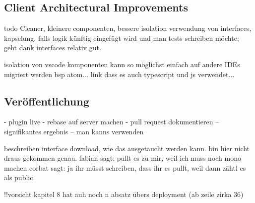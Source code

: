 \subsection{Client Architectural Improvements}
todo
Cleaner, kleinere componenten, bessere isolation
verwendung von interfaces, kapselung. falls logik künftig eingefügt wird und man tests schreiben möchte; geht dank interfaces relativ gut.

isolation von vscode komponenten
kann so möglichst einfach auf andere IDEs migriert werden
bsp atom... link dass es auch typescript und js verwendet...

\subsection{Veröffentlichung}
- plugin live
- rebase auf server machen
- pull request dokumentieren -- signifikantes ergebnis -- man kanns verwenden

beschreiben interface download, wie das ausgetaucht werden kann.
bin hier nicht draus gekommen genau.
fabian sagt: pullt es zu mir, weil ich muss noch mono machen
corbat sagt: ja ihr müsst schreiben, dass ihr es pullt, weil dann zähtl es als public.

!!vorsicht kapitel 8 hat auh noch n absatz übers deployment (ab zeile zirka 36)
